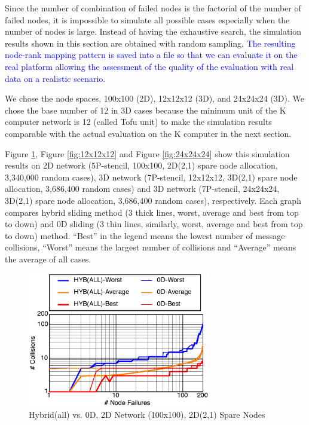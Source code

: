 \documentclass[Afour,times,sagev]{sagej}
\newcommand{\AH}[1]{%
  \textcolor{blue}{#1}}%
\begin{document}
Since the number of combination of failed nodes is the factorial of
the number of failed nodes, it is impossible to simulate all possible
cases especially when the number of nodes is large. Instead of having
the exhaustive search, the simulation results shown in this section
are obtained with random sampling. \AH{The resulting node-rank mapping
pattern is saved into a file so that we can evaluate it on
the real platform allowing the assessment of the quality of the evaluation
with real data on a realistic scenario.}

We chose the node spaces, 100x100 (2D), 12x12x12 (3D), and 24x24x24
(3D). We chose the base number of 12 in 3D cases  because the minimum
unit of the K computer network is 12 (called Tofu unit) to make the
simulation results comparable with the actual evaluation on the K
computer in the next section.

Figure \ref{fig:100x100}, Figure \ref{fig:12x12x12} and
Figure \ref{fig:24x24x24} show this simulation results on 2D network
(5P-stencil, 100x100, 2D(2,1) spare node allocation, 3,340,000 random
cases), 3D network (7P-stencil, 12x12x12, 3D(2,1) spare node
allocation, 3,686,400 random cases) and 3D network (7P-stencil,
24x24x24, 3D(2,1) spare node allocation, 3,686,400 random cases),
respectively. Each graph compares hybrid sliding method (3 thick
lines, worst, average and best from top to down) and 0D
sliding (3 thin lines, similarly, worst, average and best
from top to down) method. ``Best'' in the legend means the lowest
number of message collisions, ``Worst'' means the largest number of
collisions and ``Average'' means the average of all cases.

\begin{figure}[ht]
\centering
\includegraphics[width=80mm]{Figs/100x100-CL.eps}
  \caption{Hybrid(all) vs. 0D, 2D Network (100x100), 2D(2,1) Spare Nodes}
  \label{fig:100x100}
\end{figure}
\end{document}
